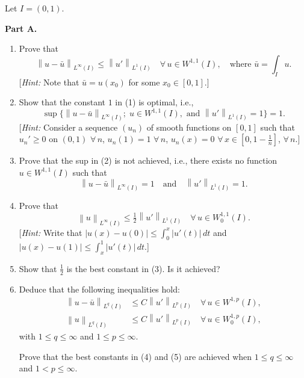 \documentclass[12pt]{article}
\newcommand{\norm}[1]{\left\|#1\right\|}
\newcommand{\abs}[1]{\left|#1\right|}
\begin{document}
\medskip
 
Let $I = (0,1)$.
 
\medskip
 
\noindent\textbf{Part A.}
 
\begin{enumerate}
\item Prove that
\begin{equation}\tag{1}
\norm{u - \bar{u}}_{L^\infty(I)} \le \norm{u'}_{L^1(I)} \quad \forall\, u \in W^{1,1}(I),
\quad \text{where } \bar{u} = \int_I u.
\end{equation}
[\textit{Hint:} Note that $\bar{u} = u(x_0)$ for some $x_0 \in [0,1]$.]
 
\item Show that the constant $1$ in (1) is optimal, i.e.,
\begin{equation}\tag{2}
\sup\{\norm{u - \bar{u}}_{L^\infty(I)};\; u \in W^{1,1}(I),\text{ and } \norm{u'}_{L^1(I)} = 1\} = 1.
\end{equation}
[\textit{Hint:} Consider a sequence $(u_n)$ of smooth functions on $[0,1]$ such that
$u_n' \ge 0$ on $(0,1)$ $\forall\, n$, $u_n(1) = 1$ $\forall\, n$, $u_n(x) = 0$ $\forall\, x \in [0,1-\tfrac{1}{n}]$, $\forall\, n$.]
 
\item Prove that the sup in (2) is not achieved, i.e., there exists no function
$u \in W^{1,1}(I)$ such that
\[
\norm{u - \bar{u}}_{L^\infty(I)} = 1 \quad \text{and} \quad \norm{u'}_{L^1(I)} = 1.
\]
 
\item Prove that
\begin{equation}\tag{3}
\norm{u}_{L^\infty(I)} \le \tfrac{1}{2}\norm{u'}_{L^1(I)} \quad \forall\, u \in W^{1,1}_0(I).
\end{equation}
[\textit{Hint:} Write that $\abs{u(x) - u(0)} \le \int_0^x \abs{u'(t)}\,dt$ and
$\abs{u(x) - u(1)} \le \int_x^1 \abs{u'(t)}\,dt$.]
 
\item Show that $\tfrac{1}{2}$ is the best constant in (3). Is it achieved?
 
\noindent[\textit{Hint:} Fix $a \in (0,1)$ and consider a function $u \in W^{1,1}_0(I)$ increasing on
$(0,a)$, decreasing on $(a,1)$, with $u(a) = 1$.]
 
\item Deduce that the following inequalities hold:
\begin{align}
\norm{u - \bar{u}}_{L^q(I)} &\le C\norm{u'}_{L^p(I)} \quad \forall\, u \in W^{1,p}(I), \tag{4}\\
\norm{u}_{L^q(I)} &\le C\norm{u'}_{L^p(I)} \quad \forall\, u \in W^{1,p}_0(I), \tag{5}
\end{align}
with $1 \le q \le \infty$ and $1 \le p \le \infty$.
 
Prove that the best constants in (4) and (5) are achieved when $1 \le q \le \infty$
and $1 < p \le \infty$.
 
\noindent[\textit{Hint:} Minimize $\norm{u'}_{L^p(I)}$ in the class $u \in W^{1,p}(I)$ such that
$\norm{u - \bar{u}}_{L^q(I)} = 1$, resp.\ $u \in W^{1,p}_0(I)$ and $\norm{u}_{L^q(I)} = 1$.]
\end{enumerate}
 
\end{document}
